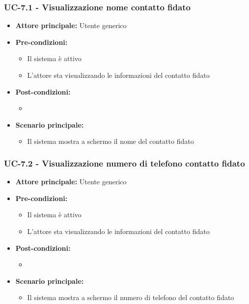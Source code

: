 \documentclass[a4paper,12pt]{article}
\begin{document}
\subsubsection{UC-7.1 - Visualizzazione nome contatto fidato} \label{subsec:UC-7.1}
\begin{itemize}
    \item \textbf{Attore principale:} Utente generico
    \item \textbf{Pre-condizioni:} 
    \begin{itemize}
        \item Il sistema è attivo
        \item L'attore sta visualizzando le informazioni del contatto fidato
    \end{itemize}
    \item \textbf{Post-condizioni:}
    \begin{itemize}
        \item 
    \end{itemize}
    \item \textbf{Scenario principale:} 
    \begin{itemize}
        \item Il sistema mostra a schermo il nome del contatto fidato
    \end{itemize}
\end{itemize}

\subsubsection{UC-7.2 - Visualizzazione numero di telefono contatto fidato} \label{subsec:UC-7.2}
\begin{itemize}
    \item \textbf{Attore principale:} Utente generico
    \item \textbf{Pre-condizioni:} 
    \begin{itemize}
        \item Il sistema è attivo
        \item L'attore sta visualizzando le informazioni del contatto fidato
    \end{itemize}
    \item \textbf{Post-condizioni:}
    \begin{itemize}
        \item
    \end{itemize}
    \item \textbf{Scenario principale:} 
    \begin{itemize}
        \item Il sistema mostra a schermo il numero di telefono del contatto fidato
    \end{itemize}
\end{itemize}
\end{document}
